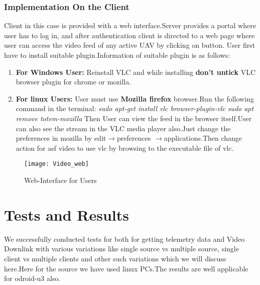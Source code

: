 \documentclass[12pt]{article}
\begin{document}
\subsubsection{Implementation On the Client}
Client in this case is provided with a web interface.Server provides a portal where user has to log in, and after authentication client is directed to a web page where user can access the video feed of any active UAV by clicking on button.\newline
User first have to install suitable plugin.Information of suitable plugin is as follows:
\begin{enumerate}
\item {\bf For Windows User:} Reinstall VLC and while installing {\bf don't untick} VLC browser plugin for chrome or mozilla.

\item {\bf For linux Users:} User must use {\bf Mozilla firefox} browser.Run the following command in the terminal:
\newline
\hspace*{50px}\textit{sudo apt-get install vlc browser-plugin-vlc} \newline
\hspace*{50px}\textit{sudo apt remove totem-mozilla}\newline
Then User can view the feed in the browser itself.User can also see the stream in the VLC media player also.Just change the preferences in mozilla by edit$\rightarrow$preferences $\rightarrow$applications.Then change action for asf video to use vlc by browsing to the executable file of vlc.\newline
\end{enumerate} 
\begin{figure}[ht!]
\centering
\texttt{[image: Video\_web]}
\caption{Web-Interface for Users}
\label{overflow}
\end{figure}
\newpage
\section{Tests and Results}
We successfully conducted tests for both for getting telemetry data and Video Downlink with various variations like single source vs multiple source, single client vs multiple clients and other such variations which we will discuss here.Here for the source we have used linux PCs.The results are well applicable for odroid-u3 also.\newline
\end{document}
